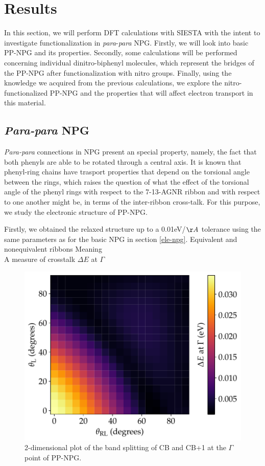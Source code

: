 
\chapter{Results}

\label{ch4}

In this section, we will perform DFT calculations with SIESTA with the intent to investigate functionalization in \textit{para}-\textit{para} NPG. Firstly, we will look into basic PP-NPG and its properties. Secondly, some calculations will be performed concerning individual dinitro-biphenyl molecules, which represent the bridges of the PP-NPG after functionalization with nitro groups. Finally, using the knowledge we acquired from the previous calculations, we explore the nitro-functionalized PP-NPG and the properties that will affect electron transport in this material.

\section{\textit{Para-para} NPG}
\textit{Para-para} connections in NPG present an special property, namely, the fact that both phenyls are able to be rotated through a central axis. It is known that phenyl-ring chains have trasport properties that depend on the torsional angle between the rings\parencite{Viljas2008}, which raises the question of what the effect of the torsional angle of the phenyl rings with respect to the 7-13-AGNR ribbon and with respect to one another might be, in terms of the inter-ribbon cross-talk. For this purpose, we study the electronic structure of PP-NPG.

Firstly, we obtained the relaxed structure up to a 0.01eV/\(\AA\) tolerance using the same parameters as for the basic NPG in section \ref{ele-npg}.
Equivalent and nonequivalent ribbons
Meaning\\
A measure of crosstalk \(\Delta E\) at \(\Gamma\)\\

\begin{figure}[h!]
	\centering
	\includegraphics[width=0.7\linewidth]{Figures/2dmap}
	\decoRule
	\caption{2-dimensional plot of the band splitting of CB and CB+1 at the \(\Gamma\) point of PP-NPG.}
	\label{fig:2dmap}
\end{figure}


